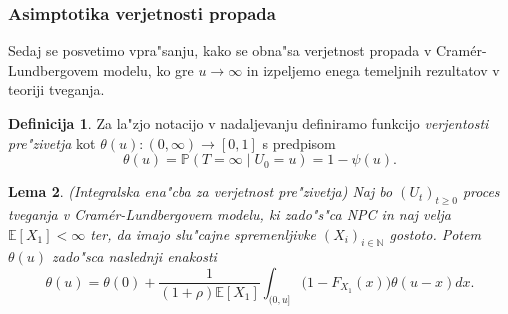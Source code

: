 \documentclass[12pt, a4paper, reqno]{amsart}
\theoremstyle{definition}
\newtheorem{definicija}{Definicija}[section]
\theoremstyle{plain}
\newtheorem{lema}[definicija]{Lema}
\newcommand{\N}{\mathbb{N}}
\newcommand{\E}{\mathbb{E}}
\newcommand{\Prob}{\mathbb{P}}
\newcommand{\1}{\mathds{1}}
\begin{document}
        \subsubsection{Asimptotika verjetnosti propada}
            Sedaj se posvetimo vpra"sanju, kako se obna"sa verjetnost propada v Cramér-Lundbergovem modelu,
            ko gre $u\rightarrow\infty$ in izpeljemo enega temeljnih rezultatov v teoriji tveganja.

            \begin{definicija}
                Za la"zjo notacijo v nadaljevanju definiramo funkcijo \textit{verjentosti pre"zivetja} kot
                $\theta(u):(0, \infty) \to [0, 1]$ s predpisom
                \begin{equation*}
                    \theta(u) = \Prob\left(T=\infty\mid U_0=u\right) = 1 - \psi(u).
                \end{equation*}
                \label{def:verjetnostPrezivetja}
            \end{definicija}

            \begin{lema}(Integralska ena"cba za verjetnost pre"zivetja)
                Naj bo $(U_t)_{t\geq0}$ proces tveganja v Cramér-Lundbergovem modelu, ki zado"s"ca NPC in naj 
                velja $\E\left[X_1\right]<\infty$ ter, da imajo slu"cajne spremenljivke $(X_i)_{i\in\N}$ 
                gostoto. Potem $\theta(u)$ zado"sca naslednji enakosti
                \begin{equation}
                    \theta(u) = \theta(0) + \frac{1}{(1+\rho)\E\left[X_1\right]} \int_{(0, u]}\bigl(1 - F_{X_1}(x)\bigr)\theta(u - x)dx.
                    \label{eq:verjetnostPrezivetja}
                \end{equation}
                \label{lema:verjetnostPrezivetja}
            \end{lema}
\end{document}
